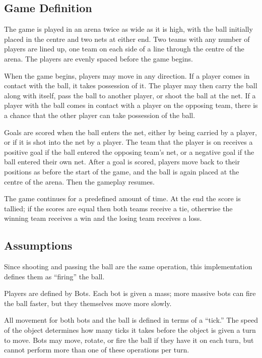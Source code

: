 \documentclass[%
        compressed,
        notitlepage,
        narroweqnarray,
        inline,
        ]{ieee}
\begin{document}
\subsection{Game Definition}

The game is played in an arena twice as wide as it is high, with the
ball initially placed in the centre and two nets at either end. Two teams
with any number of players are lined up, one team on each side of a line through the
centre of the arena. The players are evenly spaced before the game begins.

When the game begins, players may move in any direction. If a player comes
in contact with the ball, it takes possession of it. The player may then
carry the ball along with itself, pass the ball to another player, or shoot
the ball at the net. If a player with the ball comes in contact with a
player on the opposing team, there is a chance that the other player can
take possession of the ball.

Goals are scored when the ball enters the net, either by being carried by a
player, or if it is shot into the net by a player. The team that the player
is on receives a positive goal if the ball entered the opposing team's net,
or a negative goal if the ball entered their own net. After a goal is
scored, players move back to their positions as before the start of the
game, and the ball is again placed at the centre of the arena. Then the
gameplay resumes.

The game continues for a predefined amount of time. At the end the score is
tallied; if the scores are equal then both teams receive a tie, otherwise
the winning team receives a win and the losing team receives a loss.

\subsection{Assumptions}

Since shooting and passing the ball are the same operation, this
implementation defines them as ``firing'' the ball.

Players are defined by Bots. Each bot is given a mass; more massive
bots can fire the ball faster, but they themselves move more slowly.

All movement for both bots and the ball is defined in terms of a ``tick.''
The speed of the object determines how many ticks it takes before the object
is given a turn to move. Bots may move, rotate, or fire the ball
if they have it on each turn, but cannot perform more than one of these
operations per turn.
\end{document}

